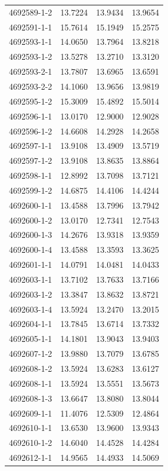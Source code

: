\begin{longtable}{lrrr}
4692589-1-2 & 13.7224 & 13.9434 & 13.9654 \\
4692591-1-1 & 15.7614 & 15.1949 & 15.2575 \\
4692593-1-1 & 14.0650 & 13.7964 & 13.8218 \\
4692593-1-2 & 13.5278 & 13.2710 & 13.3120 \\
4692593-2-1 & 13.7807 & 13.6965 & 13.6591 \\
4692593-2-2 & 14.1060 & 13.9656 & 13.9819 \\
4692595-1-2 & 15.3009 & 15.4892 & 15.5014 \\
4692596-1-1 & 13.0170 & 12.9000 & 12.9028 \\
4692596-1-2 & 14.6608 & 14.2928 & 14.2658 \\
4692597-1-1 & 13.9108 & 13.4909 & 13.5719 \\
4692597-1-2 & 13.9108 & 13.8635 & 13.8864 \\
4692598-1-1 & 12.8992 & 13.7098 & 13.7121 \\
4692599-1-2 & 14.6875 & 14.4106 & 14.4244 \\
4692600-1-1 & 13.4588 & 13.7996 & 13.7942 \\
4692600-1-2 & 13.0170 & 12.7341 & 12.7543 \\
4692600-1-3 & 14.2676 & 13.9318 & 13.9359 \\
4692600-1-4 & 13.4588 & 13.3593 & 13.3625 \\
4692601-1-1 & 14.0791 & 14.0481 & 14.0433 \\
4692603-1-1 & 13.7102 & 13.7633 & 13.7166 \\
4692603-1-2 & 13.3847 & 13.8632 & 13.8721 \\
4692603-1-4 & 13.5924 & 13.2470 & 13.2015 \\
4692604-1-1 & 13.7845 & 13.6714 & 13.7332 \\
4692605-1-1 & 14.1801 & 13.9043 & 13.9403 \\
4692607-1-2 & 13.9880 & 13.7079 & 13.6785 \\
4692608-1-2 & 13.5924 & 13.6283 & 13.6127 \\
4692608-1-1 & 13.5924 & 13.5551 & 13.5673 \\
4692608-1-3 & 13.6647 & 13.8080 & 13.8044 \\
4692609-1-1 & 11.4076 & 12.5309 & 12.4864 \\
4692610-1-1 & 13.6530 & 13.9600 & 13.9343 \\
4692610-1-2 & 14.6040 & 14.4528 & 14.4284 \\
4692612-1-1 & 14.9565 & 14.4933 & 14.5069 \\

\end{longtable}
